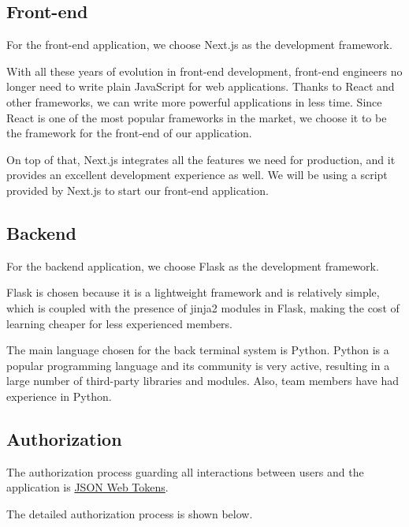 \documentclass[12pt]{article}
\begin{document}
  \subsection{Front-end}
  
  For the front-end application, we choose Next.js as the development framework.

  With all these years of evolution in front-end development, front-end engineers no longer need to write plain JavaScript for web applications. Thanks to React and other frameworks, we can write more powerful applications in less time. Since React is one of the most popular frameworks in the market, we choose it to be the framework for the front-end of our application.
  
  On top of that, Next.js integrates all the features we need for production, and it provides an excellent development experience as well. We will be using a script provided by Next.js to start our front-end application.
  
  \subsection{Backend}
  
  For the backend application, we choose Flask as the development framework.

  Flask is chosen because it is a lightweight framework and is relatively simple, which is coupled with the presence of jinja2 modules in Flask, making the cost of learning cheaper for less experienced members.
  
  The main language chosen for the back terminal system is Python. Python is a popular programming language and its community is very active, resulting in a large number of third-party libraries and modules. Also, team members have had experience in Python.
  
  \subsection{Authorization}
  
  The authorization process guarding all interactions between users and the application is 
  \href{https://jwt.io/introduction}{JSON Web Tokens}.
  
  The detailed authorization process is shown below.
  
\end{document}

